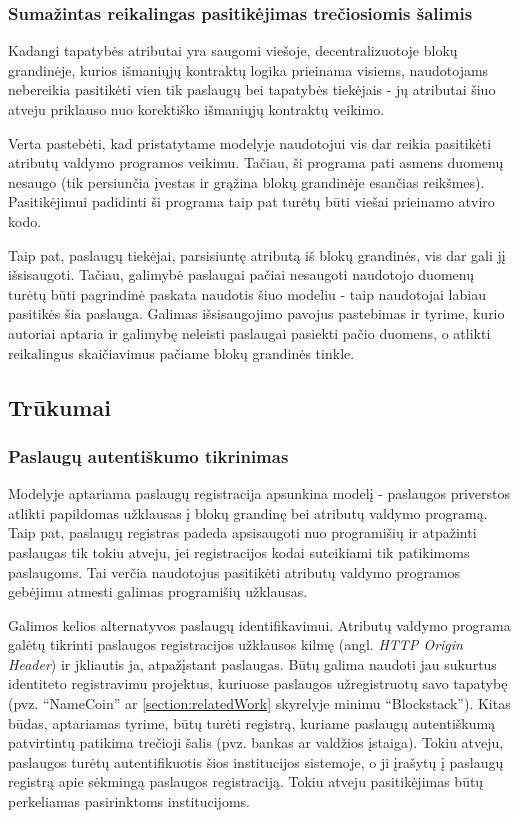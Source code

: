 \subsubsection{Sumažintas reikalingas pasitikėjimas trečiosiomis šalimis}

Kadangi tapatybės atributai yra saugomi viešoje, decentralizuotoje blokų grandinėje, kurios išmaniųjų kontraktų
logika prieinama visiems, naudotojams nebereikia pasitikėti vien tik paslaugų bei tapatybės tiekėjais - jų
atributai šiuo atveju priklauso nuo korektiško išmaniųjų kontraktų veikimo.

Verta pastebėti, kad
pristatytame modelyje naudotojui vis dar reikia pasitikėti atributų valdymo programos veikimu. Tačiau, ši programa pati
asmens duomenų nesaugo (tik persiunčia įvestas ir grąžina blokų grandinėje esančias reikšmes). Pasitikėjimui
padidinti ši programa taip pat turėtų būti viešai prieinamo atviro kodo.

Taip pat, paslaugų tiekėjai, parsisiuntę atributą
iš blokų grandinės, vis dar gali jį išsisaugoti. Tačiau, galimybė paslaugai pačiai nesaugoti naudotojo duomenų turėtų būti pagrindinė paskata
naudotis šiuo modeliu - taip naudotojai labiau pasitikės šia paslauga. Galimas išsisaugojimo pavojus pastebimas ir
\cite{MITPaper} tyrime, kurio autoriai aptaria ir galimybę neleisti paslaugai pasiekti pačio duomens, o atlikti
reikalingus skaičiavimus pačiame blokų grandinės tinkle.

\subsection{Trūkumai}

\subsubsection{Paslaugų autentiškumo tikrinimas}

Modelyje aptariama paslaugų registracija apsunkina modelį - paslaugos priverstos
atlikti papildomas užklausas į blokų grandinę bei atributų valdymo programą. Taip pat, paslaugų registras padeda apsisaugoti nuo programišių
ir atpažinti paslaugas tik tokiu atveju,
jei registracijos kodai suteikiami tik patikimoms paslaugoms. Tai verčia naudotojus pasitikėti atributų valdymo programos gebėjimu
atmesti galimas programišių užklausas. 

Galimos kelios alternatyvos paslaugų identifikavimui. Atributų valdymo programa galėtų tikrinti paslaugos registracijos užklausos
kilmę (angl. \textit{HTTP Origin Header}) ir jkliautis ja, atpažįstant paslaugas. Būtų galima naudoti jau sukurtus identiteto
registravimu projektus, kuriuose paslaugos užregistruotų savo tapatybę (pvz. \enquote{NameCoin} ar \hypertarget{section:relatedWork}{\ref{section:relatedWork}}
skyrelyje minimu \enquote{Blockstack}). Kitas būdas, aptariamas \cite{Baars2016} tyrime, būtų turėti registrą, kuriame paslaugų autentiškumą
patvirtintų patikima trečioji šalis (pvz. bankas ar valdžios įstaiga). Tokiu atveju, paslaugos turėtų autentifikuotis šios institucijos
sistemoje, o ji įrašytų į paslaugų registrą apie sėkmingą paslaugos registraciją. Tokiu atveju pasitikėjimas būtų perkeliamas
pasirinktoms institucijoms.

